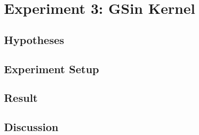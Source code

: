 \documentclass[./\jobname.tex]{subfiles}
\begin{document}
\chapter {Experiment 3: GSin Kernel}
\label{chap:experimet_3}

\section{Hypotheses}

\section{Experiment Setup}

\section{Result}

\section{Discussion}
\end{document}
